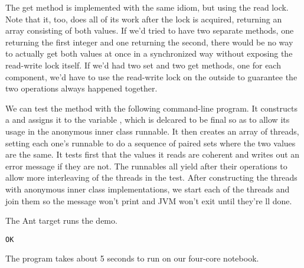 The get method is implemented with the same idiom, but using the
read lock.
%
%
Note that it, too, does all of its work after the lock is acquired,
returning an array consisting of both values.  If we'd tried to have
two separate methods, one returning the first integer and one
returning the second, there would be no way to actually get both
values at once in a synchronized way without exposing the read-write
lock itself.  If we'd had two set and two get methods, one for each
component, we'd have to use the read-write lock on the outside to
guarantee the two operations always happened together.  

We can test the method with the following command-line program.
%
%
It constructs a  and assigns it to the variable
, which is delcared to be final so as to allow its usage in
the anonymous inner class runnable.  It then creates an array of threads,
setting each one's runnable to do a sequence of paired sets where the
two values are the same.  It tests first that the values it reads are
coherent and writes out an error message if they are not.  The runnables
all yield after their operations to allow more interleaving of the threads
in the test.  After constructing the threads with anonymous inner class
 implementations, we start each of the threads and join them
so the message won't print and JVM won't exit until they're ll done.

The Ant target  runs the demo.  
%
\begin{verbatim}
OK
\end{verbatim}
%
The program takes about 5 seconds to run on our four-core notebook.


